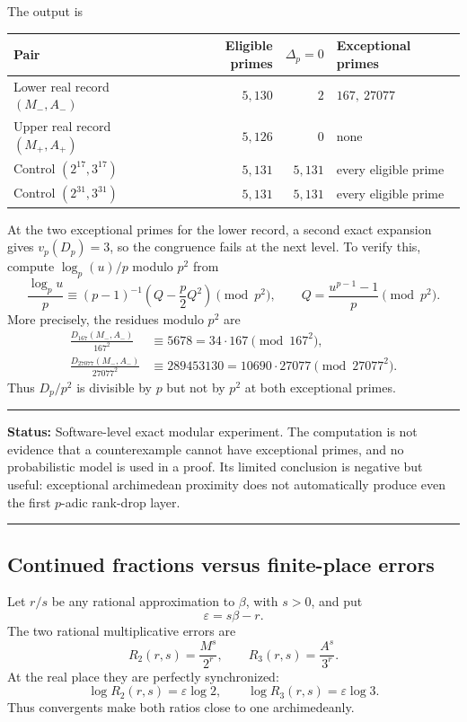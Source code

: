 \documentclass[11pt,oneside]{article}
\theoremstyle{definition}
\theoremstyle{remark}
\newenvironment{statusbox}[1]
{\begin{center}\begin{minipage}{0.94\textwidth}\raggedright\hbadness=10000\hrule
\vspace{0.45em}\textbf{Status:} #1\par\vspace{0.35em}}
{\vspace{0.35em}\hrule\end{minipage}\end{center}}
\begin{document}
The output is
\begin{center}
\begin{tabular}{lrrl}
\toprule
Pair & Eligible primes & $\Delta_p=0$ & Exceptional primes \\
\midrule
Lower real record $(M_-,A_-)$ & $5{,}130$ & $2$ & $167,\ 27077$ \\
Upper real record $(M_+,A_+)$ & $5{,}126$ & $0$ & none \\
Control $(2^{17},3^{17})$ & $5{,}131$ & $5{,}131$ & every eligible prime \\
Control $(2^{31},3^{31})$ & $5{,}131$ & $5{,}131$ & every eligible prime \\
\bottomrule
\end{tabular}
\end{center}

At the two exceptional primes for the lower record, a second exact expansion gives
$v_p(D_p)=3$, so the congruence fails at the next level.  To verify this, compute
$\log_p(u)/p$ modulo $p^2$ from
\begin{equation}\label{eq:c3-second-level}
 \frac{\log_pu}{p}
 \equiv(p-1)^{-1}\left(Q-\frac p2Q^2\right)\pmod{p^2},
 \qquad
 Q=\frac{u^{p-1}-1}{p}\pmod{p^2}.
\end{equation}
More precisely, the residues modulo $p^2$ are
\begin{align*}
 \frac{D_{167}(M_-,A_-)}{167^2}
   &\equiv 5678=34\cdot167\pmod{167^2},\\
 \frac{D_{27077}(M_-,A_-)}{27077^2}
   &\equiv 289453130=10690\cdot27077\pmod{27077^2}.
\end{align*}
Thus $D_p/p^2$ is divisible by $p$ but not by $p^2$ at both exceptional primes.

\begin{statusbox}{Software-level exact modular experiment.  The computation is not evidence
that a counterexample cannot have exceptional primes, and no probabilistic model is used in a
proof.  Its limited conclusion is negative but useful: exceptional archimedean proximity does
not automatically produce even the first $p$-adic rank-drop layer.}
\end{statusbox}

\subsection{Continued fractions versus finite-place errors}
\label{sec:c3-convergents}

Let $r/s$ be any rational approximation to $\beta$, with $s>0$, and put
\[
 \varepsilon=s\beta-r.
\]
The two rational multiplicative errors are
\begin{equation}\label{eq:c3-ratios}
 R_2(r,s)=\frac{M^s}{2^r},
 \qquad
 R_3(r,s)=\frac{A^s}{3^r}.
\end{equation}
At the real place they are perfectly synchronized:
\begin{equation}\label{eq:c3-real-errors}
 \log R_2(r,s)=\varepsilon\log2,
 \qquad
 \log R_3(r,s)=\varepsilon\log3.
\end{equation}
Thus convergents make both ratios close to one archimedeanly.
\end{document}
